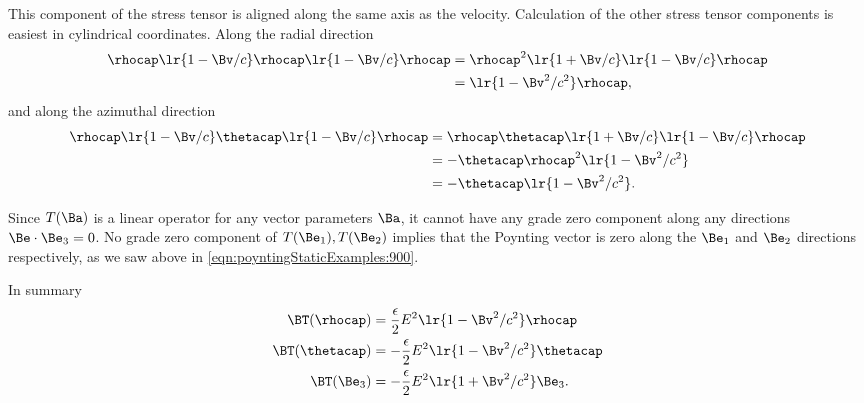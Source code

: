 This component of the stress tensor is aligned along the same axis as the velocity.
Calculation of the other stress tensor components is easiest in cylindrical coordinates.  Along the radial direction
\begin{equation}\label{eqn:poyntingStaticExamples:1020}
\begin{aligned}
\rhocap \lr{ 1 - \Bv/c } \rhocap \lr{1 - \Bv/c} \rhocap
&=
\rhocap^2 \lr{ 1 + \Bv/c} \lr{1 - \Bv/c} \rhocap \\
&= \lr{1 - \Bv^2/c^2} \rhocap,
\end{aligned}
\end{equation}
and along the azimuthal direction
\begin{equation}\label{eqn:poyntingStaticExamples:1100}
\begin{aligned}
\rhocap \lr{ 1 - \Bv/c } \thetacap \lr{1 - \Bv/c} \rhocap
&=
\rhocap \thetacap \lr{1 + \Bv/c} \lr{1 - \Bv/c} \rhocap \\
&=
-\thetacap \rhocap^2 \lr{1 - \Bv^2/c^2} \\
&=
-\thetacap \lr{1 - \Bv^2/c^2}.
\end{aligned}
\end{equation}

Since \( T(\Ba) \) is a linear operator for any vector parameters \( \Ba \), it cannot have any grade zero component along any directions \( \Be \cdot \Be_3 = 0 \).
No grade zero component of \( T(\Be_1), T(\Be_2) \) implies that the Poynting vector is zero along the \( \Be_1 \) and \( \Be_2 \) directions respectively, as we saw above in
\cref{eqn:poyntingStaticExamples:900}.
%
%
%

In summary
\begin{equation}\label{eqn:poyntingStaticExamples:1080}
\begin{aligned}
\BT(\rhocap) &= \frac{\epsilon}{2} E^2 \lr{1 -\Bv^2/c^2} \rhocap \\
\BT(\thetacap) &= -\frac{\epsilon}{2} E^2 \lr{1 -\Bv^2/c^2} \thetacap \\
\BT(\Be_3) &= -\frac{\epsilon}{2} E^2 \lr{1 + \Bv^2/c^2 } \Be_3.
\end{aligned}
\end{equation}

